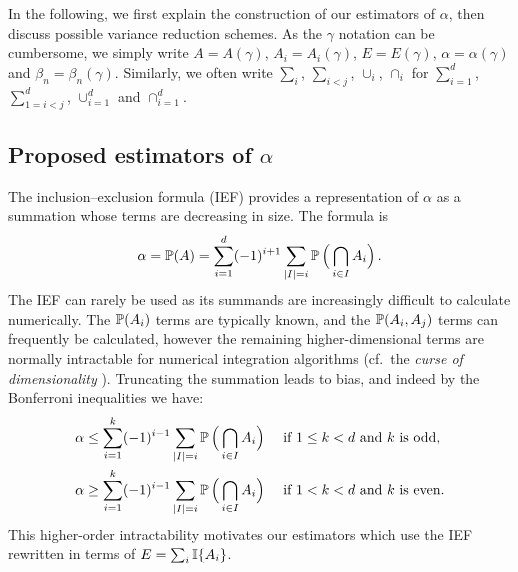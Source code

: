 In the following, we first explain the construction of our estimators of $\alpha$, then discuss possible variance reduction schemes. As the $\gamma$ notation can be cumbersome, we simply write $A=A(\gamma)$, $A_i = A_i(\gamma)$, $E = E(\gamma)$, $\alpha = \alpha(\gamma)$ and $\beta_n = \beta_n(\gamma)$. Similarly, we often write $\sum_i$, $\sum_{i<j}$, $\cup_i$, $\cap_i$ for $\sum_{i=1}^d$,$\sum_{1=i<j}^d$, $\cup_{i=1}^d$ and $\cap_{i=1}^d$.

\subsection{Proposed estimators of $\alpha$}

The inclusion--exclusion formula (IEF) provides a representation of $\alpha$ 
as a summation whose terms are decreasing in size. 
The formula is
\begin{equation} \label{incl_excl}
 \alpha = \operatorname{{\mathbb P}}(A)
  =\sum_{i=1}^d  (-1)^{i+1} \sum_{|I|= i}  \operatorname{{\mathbb P}}\Big(\bigcap_{i\in I}A_i\Big)  \,.
\end{equation}
The IEF can rarely be used as its summands are increasingly difficult to calculate numerically. 
The $\operatorname{{\mathbb P}}(A_i)$ terms are typically known, and the $\operatorname{{\mathbb P}}(A_i,A_j)$ terms can frequently be calculated, however the remaining higher-dimensional terms are normally intractable for numerical integration algorithms (cf.\ the \emph{curse of dimensionality} \cite[Chapter IX]{asmussen2007stochastic}). 
Truncating the summation leads to bias, and indeed by the Bonferroni inequalities we have:
\begin{align}
  \alpha &\le \sum_{i=1}^k  (-1)^{i-1} \sum_{|I|= i} \operatorname{{\mathbb P}}\Big(\bigcap_{i\in I}A_i\Big) \quad \text{ if } 1\le k < d \text{ and } k \text{ is odd}, \label{bonf_odd} \\
  \alpha &\ge \sum_{i=1}^k  (-1)^{i-1} \sum_{|I|= i} \operatorname{{\mathbb P}}\Big(\bigcap_{i\in I}A_i\Big) \quad \text{ if } 1<k<d \text{ and } k \text{ is even}. \label{bonf_even}
\end{align}
This higher-order intractability motivates our estimators which use the IEF rewritten in terms of $E = \sum_i \mathbb I\{ A_i \}$.

